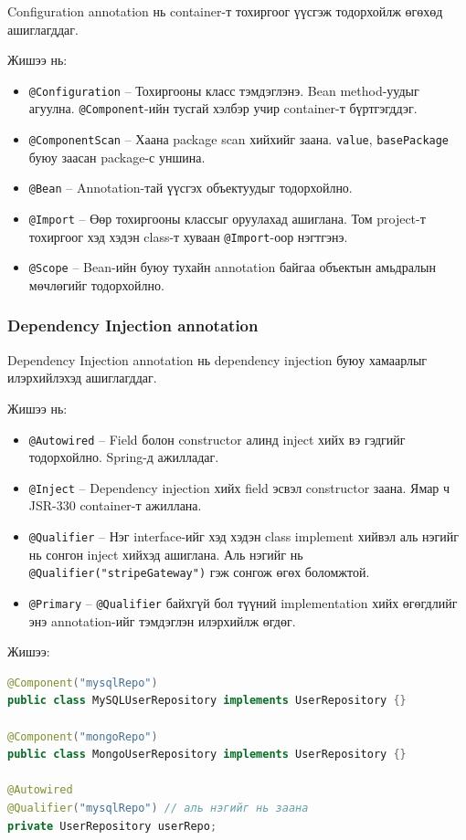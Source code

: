 Configuration annotation нь container-т тохиргоог үүсгэж тодорхойлж өгөхөд ашиглагддаг.

Жишээ нь:
\begin{itemize}
    \item \texttt{@Configuration} -- Тохиргооны класс тэмдэглэнэ. Bean method-уудыг агуулна. \texttt{@Component}-ийн тусгай хэлбэр учир container-т бүртгэгддэг.
    \item \texttt{@ComponentScan} -- Хаана package scan хийхийг заана. \texttt{value}, \texttt{basePackage} буюу заасан package-с уншина.
    \item \texttt{@Bean} -- Annotation-тай үүсгэх объектуудыг тодорхойлно.
    \item \texttt{@Import} -- Өөр тохиргооны классыг оруулахад ашиглана. Том project-т тохиргоог хэд хэдэн class-т хуваан \texttt{@Import}-оор нэгтгэнэ.
    \item \texttt{@Scope} -- Bean-ийн буюу тухайн annotation байгаа объектын амьдралын мөчлөгийг тодорхойлно.
\end{itemize}

\subsubsection{Dependency Injection annotation}

Dependency Injection annotation нь dependency injection буюу хамаарлыг илэрхийлэхэд ашиглагддаг.

Жишээ нь:
\begin{itemize}
    \item \texttt{@Autowired} -- Field болон constructor алинд inject хийх вэ гэдгийг тодорхойлно. Spring-д ажилладаг.
    \item \texttt{@Inject} -- Dependency injection хийх field эсвэл constructor заана. Ямар ч JSR-330 container-т ажиллана.
    \item \texttt{@Qualifier} -- Нэг interface-ийг хэд хэдэн class implement хийвэл аль нэгийг нь сонгон inject хийхэд ашиглана. Аль нэгийг нь \texttt{@Qualifier("stripeGateway")} гэж сонгож өгөх боломжтой.
    \item \texttt{@Primary} -- \texttt{@Qualifier} байхгүй бол түүний implementation хийх өгөгдлийг энэ annotation-ийг тэмдэглэн илэрхийлж өгдөг.
\end{itemize}

Жишээ:

\begin{lstlisting}[language=Java, caption={\texttt{@Qualifier} ашигласан жишээ}, label={lst:qualifier-example}]
@Component("mysqlRepo")
public class MySQLUserRepository implements UserRepository {}

@Component("mongoRepo")
public class MongoUserRepository implements UserRepository {}

@Autowired
@Qualifier("mysqlRepo") // аль нэгийг нь заана
private UserRepository userRepo;
\end{lstlisting}

